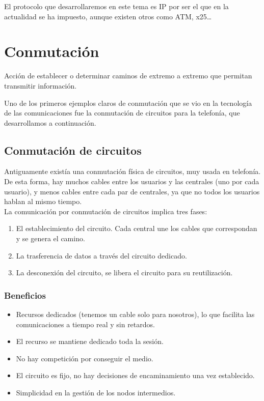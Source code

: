 El protocolo que desarrollaremos en este tema es \acrshort{IP} por ser el que en la actualidad se ha impuesto, aunque existen otros como \acrshort{ATM}, x25\ldots

\section{Conmutación}

\begin{definicion}[Conmutación]
    Acción de establecer o determinar caminos de extremo a extremo que permitan transmitir información.         
\end{definicion}

Uno de los primeros ejemplos claros de conmutación que se vio en la tecnología de las comunicaciones fue la conmutación de circuitos para la telefonía, que desarrollamos a continuación.
\subsection{Conmutación de circuitos}

Antiguamente existía una conmutación física de circuitos, muy usada en telefonía. De esta forma, hay muchos cables entre los usuarios y las centrales (uno por cada usuario), y menos cables entre cada par de centrales, ya que no todos los usuarios hablan al mismo tiempo. \\

La comunicación por conmutación de circuitos implica tres fases:
\begin{enumerate}
    \item El establecimiento del circuito. Cada central une los cables que correspondan y se genera el camino. 
    \item La trasferencia de datos a través del circuito dedicado.
    \item La desconexión del circuito, se libera el circuito para su reutilización.
\end{enumerate}

\subsubsection{Beneficios}
\begin{itemize}
    \item Recursos dedicados (tenemos un cable solo para nosotros), lo que facilita las comunicaciones a tiempo real y sin retardos.
    \item El recurso se mantiene dedicado toda la sesión.
    \item No hay competición por conseguir el medio.
    \item El circuito es fijo, no hay decisiones de encaminamiento una vez establecido.
    \item Simplicidad en la gestión de los nodos intermedios.
\end{itemize}

